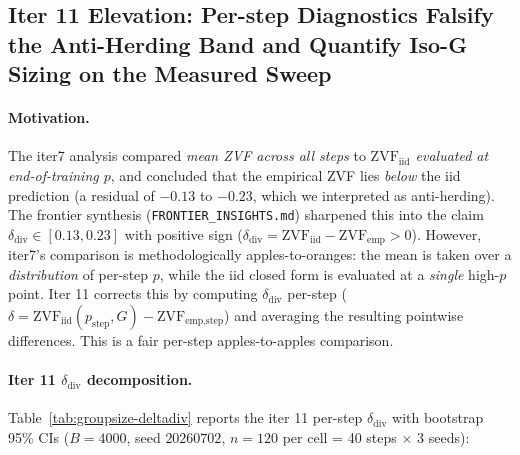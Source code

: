 \subsection{Iter 11 Elevation: Per-step Diagnostics Falsify the
Anti-Herding Band and Quantify Iso-G Sizing on the Measured Sweep}

\paragraph{Motivation.}
The iter7 analysis compared \emph{mean ZVF across all steps} to
\emph{$\mathrm{ZVF}_\text{iid}$ evaluated at end-of-training $p$},
and concluded that the empirical ZVF lies \emph{below} the iid
prediction (a residual of $-0.13$ to $-0.23$, which we interpreted
as anti-herding). The frontier synthesis (\texttt{FRONTIER\_INSIGHTS.md})
sharpened this into the claim $\delta_\text{div} \in [0.13, 0.23]$ with
positive sign ($\delta_\text{div} = \mathrm{ZVF}_\text{iid} -
\mathrm{ZVF}_\text{emp} > 0$). However, iter7's comparison is
methodologically apples-to-oranges: the mean is taken over a
\emph{distribution} of per-step $p$, while the iid closed form is
evaluated at a \emph{single} high-$p$ point. Iter 11 corrects this by
computing $\delta_\text{div}$ per-step ($\delta = \mathrm{ZVF}_\text{iid}(p_\text{step}, G)
- \mathrm{ZVF}_\text{emp,step}$) and averaging the resulting pointwise
differences. This is a fair per-step apples-to-apples comparison.

\paragraph{Iter 11 $\delta_\text{div}$ decomposition.}
Table~\ref{tab:groupsize-deltadiv} reports the iter 11 per-step
$\delta_\text{div}$ with bootstrap 95\% CIs
($B{=}4000$, seed $20260702$, $n{=}120$ per cell = 40 steps $\times$ 3 seeds):

